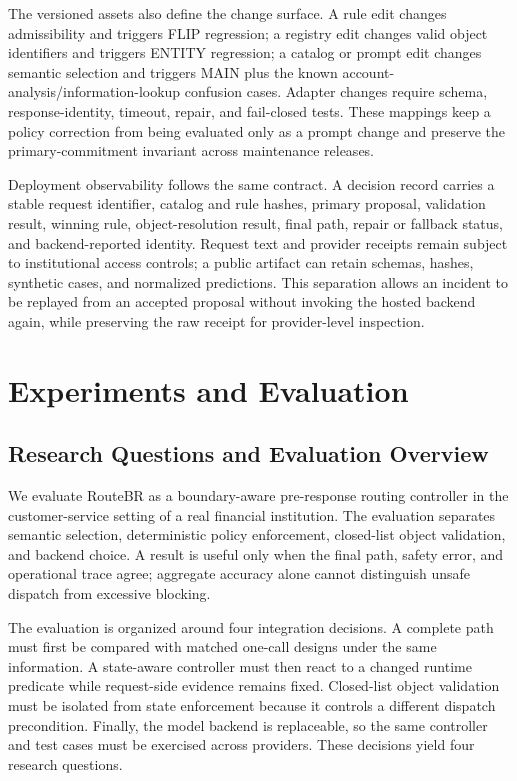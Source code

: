 \documentclass[10pt,conference,a4paper]{IEEEtran}
\newcommand{\method}{RouteBR}
\begin{document}
The versioned assets also define the change surface. A rule edit changes admissibility and triggers FLIP regression; a registry edit changes valid object identifiers and triggers ENTITY regression; a catalog or prompt edit changes semantic selection and triggers MAIN plus the known account-analysis/information-lookup confusion cases. Adapter changes require schema, response-identity, timeout, repair, and fail-closed tests. These mappings keep a policy correction from being evaluated only as a prompt change and preserve the primary-commitment invariant across maintenance releases.

Deployment observability follows the same contract. A decision record carries a stable request identifier, catalog and rule hashes, primary proposal, validation result, winning rule, object-resolution result, final path, repair or fallback status, and backend-reported identity. Request text and provider receipts remain subject to institutional access controls; a public artifact can retain schemas, hashes, synthetic cases, and normalized predictions. This separation allows an incident to be replayed from an accepted proposal without invoking the hosted backend again, while preserving the raw receipt for provider-level inspection.

\section{Experiments and Evaluation}

\subsection{Research Questions and Evaluation Overview}

We evaluate \method{} as a boundary-aware pre-response routing controller in the customer-service setting of a real financial institution. The evaluation separates semantic selection, deterministic policy enforcement, closed-list object validation, and backend choice. A result is useful only when the final path, safety error, and operational trace agree; aggregate accuracy alone cannot distinguish unsafe dispatch from excessive blocking.

The evaluation is organized around four integration decisions. A complete path must first be compared with matched one-call designs under the same information. A state-aware controller must then react to a changed runtime predicate while request-side evidence remains fixed. Closed-list object validation must be isolated from state enforcement because it controls a different dispatch precondition. Finally, the model backend is replaceable, so the same controller and test cases must be exercised across providers. These decisions yield four research questions.
\end{document}
